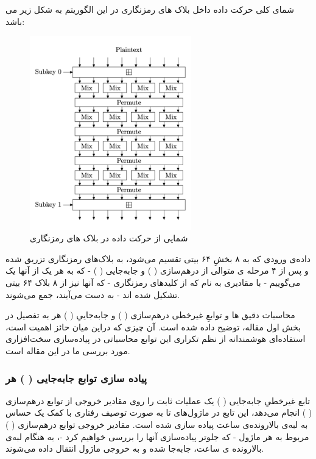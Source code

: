 شمای کلی حرکت داده داخل بلاک های رمزنگاری در این الگوریتم به شکل زیر می باشد:
\begin{figure}[H]
	\centering
	\includegraphics[width=7cm]{Images/VerilogDocumentation/cipherblock_dataflow.png}	
	\caption{شمایی از حرکت داده در بلاک های رمزنگاری}
\end{figure}
داده‌ی ورودی که به ۸ بخشِ ۶۴ بیتی تقسیم می‌شود، به بلاک‌های رمزنگاری تزریق شده و پس از ۴ مرحله ی متوالی از درهم‌سازی 
(
)
و
 جابه‌جایی 
 (
 )
 - که به هر‌ یک از آنها یک
 می‌گوییم -  
 با مقادیری به نام 
که از کلید‌های رمزنگاری - که آنها نیز از ۸ بلاک ۶۴ بیتی تشکیل شده اند - به دست می‌آیند، جمع می‌شوند.

محاسبات دقیق
ها و توابعِ غیرخطی 
درهم‌سازی 
(
)
و
جابه‌جاییِ 
(
)
 هر
به تفصیل در بخش اول مقاله، توضیح داده شده است. آن چیزی که در‌این میان حائز اهمیت است، استفاده‌ای هوشمندانه از نظم تکراری این توابع محاسباتی در پیاده‌سازی سخت‌افزاری مورد بررسی ما در این مقاله است.
\pagebreak

\subsubsection{
	پیاده سازی توابع جابه‌جایی 
	(
	)
	هر
}
 تابع غیرخطیِ جابه‌جایی
(
)
یک عملیات ثابت را روی مقادیر خروجی از توابع درهم‌سازی
(
)
انجام می‌دهد، این تابع در ماژول‌های 
تا 
به صورت توصیف رفتاری با کمک یک 
حساس به لبه‌ی بالا‌رونده‌ی ساعت پیاده سازی شده است.
مقادیر خروجی توابع درهم‌سازی (
)
مربوط به هر ماژول - که جلوتر پیاده‌سازی آنها را بررسی خواهیم کرد -، به هنگام لبه‌ی بالارونده ی ساعت، جابه‌جا شده و به خروجی ماژول انتقال داده می‌شوند. 


